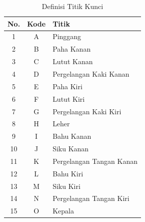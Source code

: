 \begin{table}[h]
    \captionsetup{labelfont=bf, textfont=bf}
    \caption{Definisi Titik Kunci}
    \label{tab:datapelatihanmodel}
    \vspace{-20pt}
    \begin{center}
        \begin{tabular}{|c|c|l|}
            \hline
            \textbf{No.} & \textbf{Kode} & \hspace{2cm}\textbf{Titik} \\ \hline
            1            & A             & Pinggang                   \\ \hline
            2            & B             & Paha Kanan                 \\ \hline
            3            & C             & Lutut Kanan                \\ \hline
            4            & D             & Pergelangan Kaki Kanan     \\ \hline
            5            & E             & Paha Kiri                  \\ \hline
            6            & F             & Lutut Kiri                 \\ \hline
            7            & G             & Pergelangan Kaki Kiri      \\ \hline
            8            & H             & Leher                      \\ \hline
            9            & I             & Bahu Kanan                 \\ \hline
            10           & J             & Siku Kanan                 \\ \hline
            11           & K             & Pergelangan Tangan Kanan   \\ \hline
            12           & L             & Bahu Kiri                  \\ \hline
            13           & M             & Siku Kiri                  \\ \hline
            14           & N             & Pergelangan Tangan Kiri    \\ \hline
            15           & O             & Kepala                     \\ \hline
        \end{tabular}
    \end{center}
    \vspace{-10pt}
\end{table}

